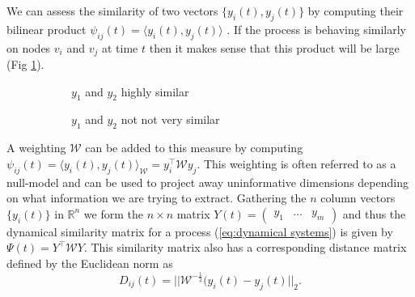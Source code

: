 \documentclass[12pt,a4paper]{article}
\begin{document}
\noindent We can assess the similarity of two vectors $\{ y_i(t),y_j(t) \}$ by computing their bilinear product $\psi_{ij}(t) = \langle y_i(t),y_j(t) \rangle $ \cite{schaub2019multiscale}. If the process is behaving similarly on nodes $v_i$ and $v_j$ at time $t$ then it makes sense that this product will be large (Fig \ref{fig:similarity vectors}).

\begin{figure}[H]
    \centering
    \begin{subfigure}[b]{0.4\linewidth}
        \centering
        \caption{$y_1$ and $y_2$ highly similar}
    \end{subfigure}
    \hfill
    \begin{subfigure}[b]{0.4\linewidth}
        \centering
        \caption{$y_1$ and $y_2$ not not very similar}
    \end{subfigure}
    \caption{} \label{fig:similarity vectors}
\end{figure}


\noindent A weighting $\mathcal W$ can be added to this measure by computing $\psi_{ij}(t) = \langle y_i(t),y_j(t) \rangle_{\mathcal W} = y_i^\top\mathcal W y_j$. This weighting is often referred to as a null-model \cite{schaub2019multiscale} and can be used to project away uninformative dimensions depending on what information we are trying to extract.  Gathering the $n$ column vectors $\{y_i(t)\}$ in $\mathbb{R}^n$ we form the $n \times n$ matrix $Y(t) = \begin{pmatrix}y_1 & \dots & y_m \end{pmatrix}$ and thus the dynamical similarity matrix for a process (\ref{eq:dynamical systems}) is given by $\Psi(t) = Y^\top \mathcal W Y$. This similarity matrix also has a corresponding distance matrix defined by the Euclidean norm \cite{schaub2019multiscale} as
\begin{equation*}
D_{ij}(t) = ||\mathcal W^{-\frac{1}{2}}(y_i(t) - y_j(t)||_2.
\end{equation*}
\end{document}

